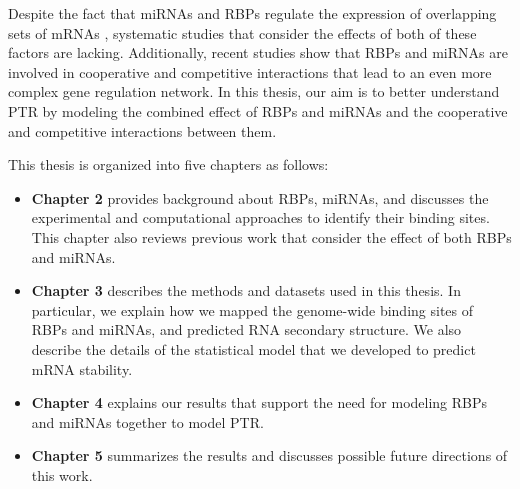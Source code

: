 Despite the fact that miRNAs and RBPs regulate the expression of overlapping sets of mRNAs , systematic studies that consider the effects of both of these factors are lacking. Additionally, recent studies show that RBPs and miRNAs are involved in cooperative and competitive interactions that lead to an even more complex gene regulation network. In this thesis, our aim is to better understand PTR by modeling the combined effect of RBPs and miRNAs and the cooperative and competitive interactions between them.

This thesis is organized into five chapters as follows:
\begin{itemize}

\item \textbf{Chapter 2} provides background about RBPs, miRNAs, and discusses the experimental and computational approaches to identify their binding sites. This chapter also reviews previous work that consider the effect of both RBPs and miRNAs.

\item \textbf{Chapter 3} describes the methods and datasets used in this thesis. In particular, we explain how we mapped the genome-wide binding sites of RBPs and miRNAs, and predicted RNA secondary structure.  We also describe the details of the statistical model that we developed to predict mRNA stability.

\item \textbf{Chapter 4} explains our results that support the need for modeling RBPs and miRNAs together to model PTR.

\item \textbf{Chapter 5} summarizes the results and discusses possible future directions of this work.
\end{itemize}